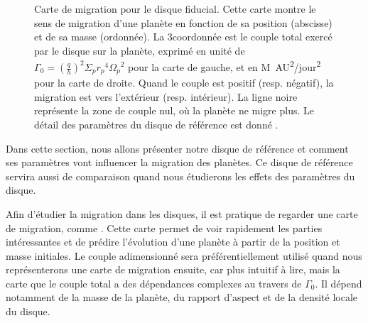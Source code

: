 \begin{figure}[htb]
\centering
{}\hfill
{}

\caption{Carte de migration pour le disque fiducial. Cette carte montre le sens de migration d'une planète en fonction de sa
position (abscisse) et de sa masse (ordonnée). La 3\ieme coordonnée est le couple total exercé par le disque sur la planète,
exprimé en unité de $\Gamma_0 = \left(\frac{q}{h}\right)^2\Sigma_p {r_p}^4 {\Omega_p}^2$ pour la carte de gauche, et en \unit{M_\odot.AU^2/jour^2} pour la carte de droite. Quand le couple est positif (resp.
négatif), la migration est vers l'extérieur (resp. intérieur). La ligne noire représente la zone de couple nul, où la planète ne
migre plus. Le détail des paramètres du disque de référence est donné .
}\label{fig:fiducial_migration_map}
\end{figure}

Dans cette section, nous allons présenter notre disque de référence et comment ses paramètres vont influencer la migration des
planètes. Ce disque de référence servira aussi de comparaison quand nous étudierons les effets des paramètres du disque.

Afin d'étudier la migration dans les disques, il est pratique de regarder une \og carte de migration\fg, comme
. Cette carte permet de voir rapidement les parties intéressantes et de prédire l'évolution
d'une planète à partir de la position et masse initiales. Le couple adimensionné  sera préférentiellement utilisé quand nous représenterons une carte de migration ensuite, car plus intuitif à lire, mais la carte  que le couple total a des dépendances complexes au travers de $\Gamma_0$. Il dépend notamment de la masse de la planète, du rapport d'aspect et de la densité locale du disque. 

